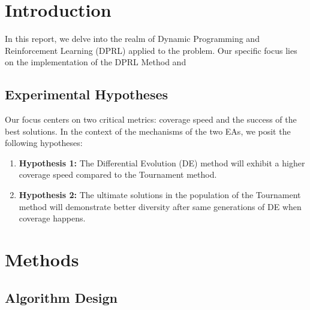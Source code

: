 
\section{Introduction}

In this report, we delve into the realm of Dynamic Programming and Reinforcement Learning (DPRL) applied to the {} problem. Our specific focus lies on the implementation of the DPRL Method and %

\subsection{Experimental Hypotheses}
Our focus centers on two critical metrics: coverage speed and the success of the best solutions. In the context of the mechanisms of the two EAs, we posit the following hypotheses:

\begin{enumerate}[label=(\roman*)]
    \item\textbf{Hypothesis 1:} The Differential Evolution (DE) method will exhibit a higher coverage speed compared to the Tournament method.
    \item\textbf{Hypothesis 2:} The ultimate solutions in the population of the Tournament method will demonstrate better diversity after same generations of DE when coverage happens.
\end{enumerate}

\section{Methods}

\subsection{Algorithm Design}

